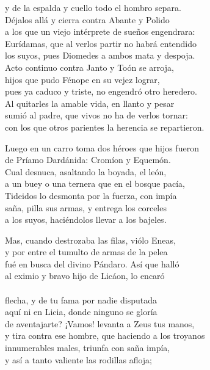 y de la espalda y cuello todo el hombro separa.\\
Déjalos allá y cierra contra Abante y Polido\\
a los que un viejo intérprete de sueños engendrara:\\
Eurídamas, que al verlos partir no habrá entendido\\
los suyos, pues Diomedes a ambos mata y despoja.\\
Acto continuo contra Janto y Toón se arroja,\\
hijos que pudo Fénope en su vejez lograr,\\
pues ya caduco y triste, no engendró otro heredero.\\
Al quitarles la amable vida, en llanto y pesar\\
sumió al padre, que vivos no ha de verlos tornar:\\
con los que otros parientes la herencia se repartieron.\par
Luego en un carro toma dos héroes que hijos fueron\\
de Príamo Dardánida: Cromíon y Equemón.\\
Cual desnuca, asaltando la boyada, el león,\\
a un buey o una ternera que en el bosque pacía,\\
Tideidos lo desmonta por la fuerza, con impía\\
saña, pilla sus armas, y entrega los corceles\\
a los suyos, haciéndolos llevar a los bajeles.\par
Mas, cuando destrozaba las filas, viólo Eneas,\\
y por entre el tumulto de armas de la pelea\\
fué en busca del divino Pándaro. Así que halló\\
al eximio y bravo hijo de Licáon, lo encaró\\
\\
flecha, y de tu fama por nadie disputada\\
aquí ni en Licia, donde ninguno se gloría\\
de aventajarte? ¡Vamos! levanta a Zeus tus manos,\\
y tira contra ese hombre, que haciendo a los troyanos\\
innumerables males, triunfa con saña impía,\\
y así a tanto valiente las rodillas afloja;\\

